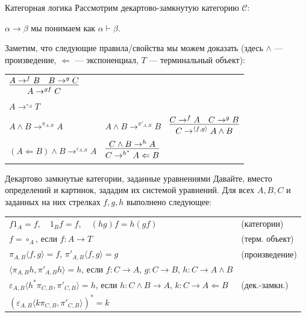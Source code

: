 \documentclass[aspectratio=169,dvipsnames,usenames]{beamer}
\begin{document}
\begin{frame}{Категорная логика}
Рассмотрим декартово-замкнутую категорию $\mathcal{C}$:

$\alpha \rightarrow \beta$ мы понимаем как $\alpha\vdash\beta$.

Заметим, что следующие правила/свойства мы можем доказать (здесь $\wedge$ --- произведение,
$\Leftarrow$ --- экспоненциал, $T$ --- терминальный объект):

\begin{tabular}{lll}
$\infer{A \rightarrow^{gf} C}{A \rightarrow^f B\quad B \rightarrow^g C}$\\
$A \rightarrow^{\circ_A} T$\\
$A \wedge B \rightarrow^{\pi_{A,B}} A$ & $A \wedge B \rightarrow^{\pi'_{A,B}} B$ & 
     $\infer{C\rightarrow^{\langle f,g\rangle}A \wedge B}{C \rightarrow^f A\quad C \rightarrow^g B}$\\

$(A \Leftarrow B) \wedge B \rightarrow^{\varepsilon_{A,B}} A$ & $\infer{C \rightarrow^{h^*} A\Leftarrow B}{C \wedge B \rightarrow^h A}$
\end{tabular}

\end{frame}

\begin{frame}{Декартово замкнутые категории, заданные уравнениями}
Давайте, вместо определений и картинок, зададим их системой уравнений. Для всех
$A,B,C$ и заданных на них стрелках $f,g,h$ выполнено следующее:
\vspace{0.5cm}

\begin{tabular}{ll}
$ f1_A = f,\quad 1_Bf = f,\quad (hg)f = h(gf) $ & (категории)\\
$ f = \circ_A$, если $f: A \rightarrow T$ & (терм. объект)\\\hline
$ \pi_{A,B}\langle f,g \rangle = f$, $\pi'_{A,B} \langle f,g \rangle = g$ & (произведение)\\
$ \langle \pi_{A,B} h, \pi'_{A,B} h \rangle = h$, если $f: C \rightarrow A$, $g: C \rightarrow B$, $h: C \rightarrow A \wedge B$\\\hline
$ \varepsilon_{A,B} \langle h^* \pi_{C,B}, \pi'_{C,B} \rangle = h$, если $h: C \wedge B \rightarrow A$, $k: C\rightarrow A \Leftarrow B$ & (дек.-замкн.)\\
$ (\varepsilon_{A,B} \langle k \pi_{C,B}, \pi'_{C,B} \rangle)^* = k$
\end{tabular}
\end{frame}
\end{document}
